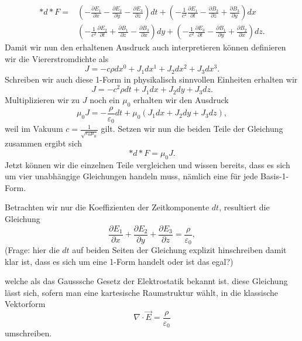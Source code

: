 \begin{align*}
	\ast d \ast F = 
	&\left( -\frac{\partial E_1}{\partial x} -\frac{\partial E_2}{\partial y} - \frac{\partial E_3}{\partial z} \right) dt +
	\left(-\frac{1}{c^2}\frac{\partial E_1}{\partial t} - \frac{\partial B_2}{\partial z} + \frac{\partial B_3}{\partial y} \right) dx\\
	&\left( -\frac{1}{c^2}\frac{\partial E_2}{\partial t} + \frac{\partial B_1}{\partial z} - \frac{\partial B_3}{\partial x} \right) dy +
	\left( -\frac{1}{c^2}\frac{\partial E_3}{\partial t} - \frac{\partial B_1}{\partial y} + \frac{\partial B_2}{\partial x} \right) dz.
\end{align*}
Damit wir nun den erhaltenen Ausdruck auch interpretieren können definieren wir die Viererstromdichte als
\begin{equation}
	J = -c\rho dx^0 + J_1 dx^1 + J_2 dx^2 +J_3 dx^3.
\end{equation}
Schreiben wir auch diese 1-Form in physikalisch sinnvollen Einheiten erhalten wir 
\begin{equation}
	J = -c^2\rho dt + J_1 dx + J_2 dy + J_3 dz.
\end{equation}
Multiplizieren wir zu $J$ noch ein $\mu_0$ erhalten wir den Ausdruck
\begin{equation}
	\mu_0 J = -\frac{\rho}{\varepsilon_0}dt + \mu_0 (J_1 dx +  J_2 dy +  J_3 dz),
\end{equation}
weil im Vakuum $c = \frac{1}{\sqrt{\varepsilon_0 \mu_0}}$ gilt. Setzen wir nun die beiden Teile der Gleichung zusammen ergibt sich
\begin{equation}
	\ast d \ast F = \mu_0 J.
\end{equation}
Jetzt können wir die einzelnen Teile vergleichen und wissen bereits, dass es sich um vier unabhängige Gleichungen handeln muss, nämlich eine für jede Basis-1-Form.

Betrachten wir nur die Koeffizienten der Zeitkomponente $dt$, resultiert die Gleichung
\begin{equation}
	\frac{\partial E_1}{\partial x} +\frac{\partial E_2}{\partial y} + \frac{\partial E_3}{\partial z} = \frac{\rho}{\varepsilon_0},
\end{equation}
(Frage: hier die $dt$ auf beiden Seiten der Gleichung explizit hinschreiben damit klar ist, dass es sich um eine 1-Form handelt oder ist das egal?)

welche als das Gausssche Gesetz der Elektrostatik bekannt ist.
diese Gleichung lässt sich, sofern man eine kartesische Raumstruktur wählt, in die klassische Vektorform
\begin{equation}
	\nabla \cdot \vec{E} = \frac{\rho}{\varepsilon_0}
\end{equation}
umschreiben.

